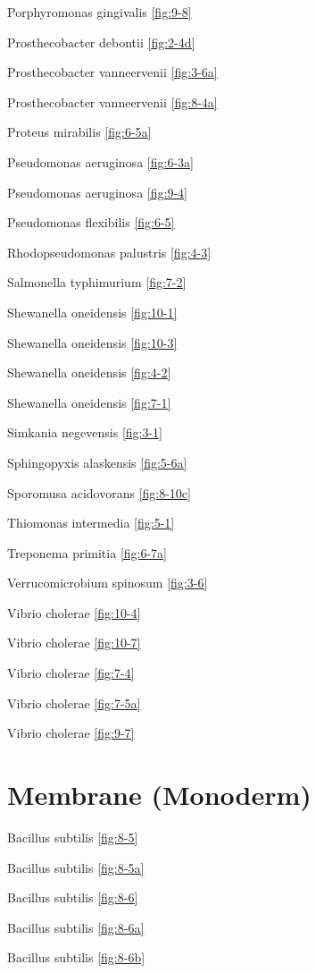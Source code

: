 \documentclass[]{tufte-book}
\begin{document}
Porphyromonas gingivalis \ref{fig:9-8}

Prosthecobacter debontii \ref{fig:2-4d}

Prosthecobacter vanneervenii \ref{fig:3-6a}

Prosthecobacter vanneervenii \ref{fig:8-4a}

Proteus mirabilis \ref{fig:6-5a}

Pseudomonas aeruginosa \ref{fig:6-3a}

Pseudomonas aeruginosa \ref{fig:9-4}

Pseudomonas flexibilis \ref{fig:6-5}

Rhodopseudomonas palustris \ref{fig:4-3}

Salmonella typhimurium \ref{fig:7-2}

Shewanella oneidensis \ref{fig:10-1}

Shewanella oneidensis \ref{fig:10-3}

Shewanella oneidensis \ref{fig:4-2}

Shewanella oneidensis \ref{fig:7-1}

Simkania negevensis \ref{fig:3-1}

Sphingopyxis alaskensis \ref{fig:5-6a}

Sporomusa acidovorans \ref{fig:8-10c}

Thiomonas intermedia \ref{fig:5-1}

Treponema primitia \ref{fig:6-7a}

Verrucomicrobium spinosum \ref{fig:3-6}

Vibrio cholerae \ref{fig:10-4}

Vibrio cholerae \ref{fig:10-7}

Vibrio cholerae \ref{fig:7-4}

Vibrio cholerae \ref{fig:7-5a}

Vibrio cholerae \ref{fig:9-7}

\section{\texorpdfstring{\textbf{Membrane
(Monoderm)}}{Membrane (Monoderm)}}\label{membrane-monoderm}

Bacillus subtilis \ref{fig:8-5}

Bacillus subtilis \ref{fig:8-5a}

Bacillus subtilis \ref{fig:8-6}

Bacillus subtilis \ref{fig:8-6a}

Bacillus subtilis \ref{fig:8-6b}
\end{document}
